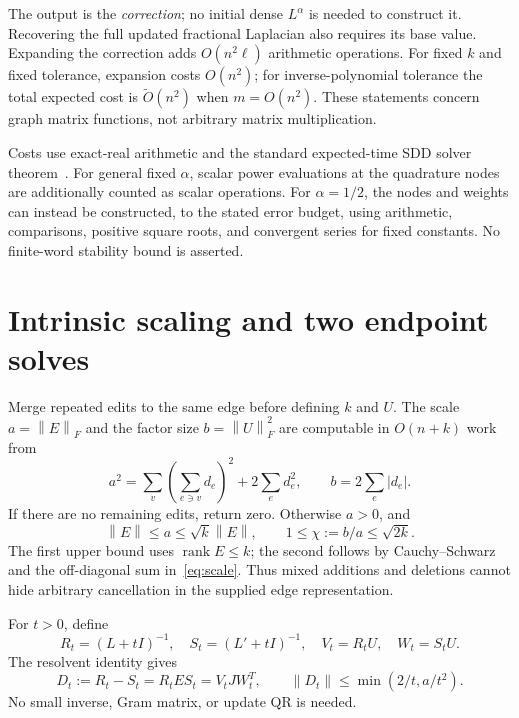 \documentclass[11pt]{article}
\newcommand{\norm}[1]{\left\lVert#1\right\rVert}
\newcommand{\rank}{\operatorname{rank}}
\begin{document}
The output is the \emph{correction}; no initial dense $L^\alpha$ is
needed to construct it. Recovering the full updated fractional Laplacian
also requires its base value. Expanding the correction adds
$O(n^2\ell)$ arithmetic operations. For fixed $k$ and fixed tolerance,
expansion costs $O(n^2)$; for inverse-polynomial tolerance the total
expected cost is $\widetilde O(n^2)$ when $m=O(n^2)$.
These statements concern graph matrix functions, not arbitrary matrix
multiplication.

Costs use exact-real arithmetic and the standard expected-time SDD
solver theorem~\cite{KMP}. For general fixed $\alpha$, scalar power
evaluations at the quadrature nodes are additionally counted as scalar
operations. For $\alpha=1/2$, the nodes and weights can instead be
constructed, to the stated error budget, using arithmetic, comparisons,
positive square roots, and convergent series for fixed constants.
No finite-word stability bound is asserted.

\section{Intrinsic scaling and two endpoint solves}
Merge repeated edits to the same edge before defining $k$ and $U$.
The scale $a=\norm E_F$ and the factor size $b=\norm U_F^2$ are computable
in $O(n+k)$ work from
\begin{equation}\label{eq:scale}
 a^2=\sum_v\left(\sum_{e\ni v}d_e\right)^2+2\sum_e d_e^2,
 \qquad b=2\sum_e|d_e|.
\end{equation}
If there are no remaining edits, return zero. Otherwise $a>0$, and
\begin{equation}\label{eq:cancellation}
 \norm E\le a\le\sqrt{k}\norm E,\qquad
 1\le\chi:=b/a\le\sqrt{2k}.
\end{equation}
The first upper bound uses $\rank E\le k$; the second follows by
Cauchy--Schwarz and the off-diagonal sum in~\eqref{eq:scale}.
Thus mixed additions and deletions cannot hide arbitrary cancellation
in the supplied edge representation.

For $t>0$, define
\[
 R_t=(L+tI)^{-1},\quad S_t=(L'+tI)^{-1},\quad
 V_t=R_tU,\quad W_t=S_tU.
\]
The resolvent identity gives
\begin{equation}\label{eq:twoendpoint}
 D_t:=R_t-S_t=R_t E S_t=V_t J W_t^T,
 \qquad \norm{D_t}\le\min(2/t,a/t^2).
\end{equation}
No small inverse, Gram matrix, or update QR is needed.
\end{document}
